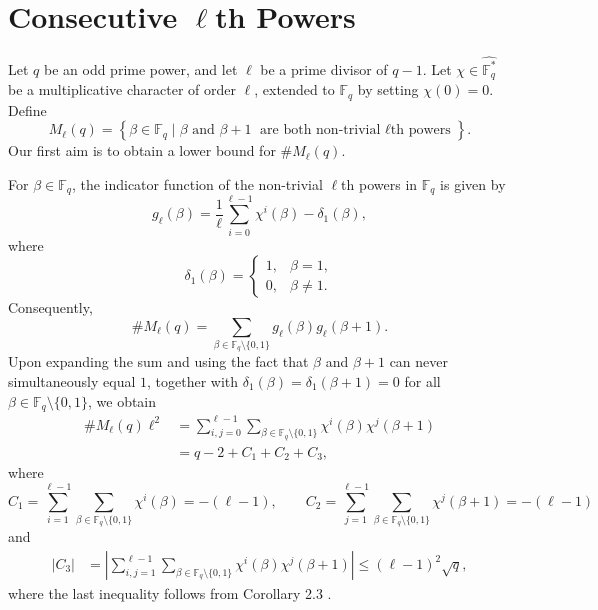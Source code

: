 \documentclass[12pt]{amsart}
\theoremstyle{definition}
\theoremstyle{remark}
\numberwithin{equation}{section}
\begin{document}
\section{Consecutive $\ell$th Powers}
Let $q$ be an odd prime power, and let $\ell$ be a prime divisor of $q-1$. Let $\chi\in\widehat{\mathbb{F}_q^*}$ be a multiplicative character of order $\ell$, extended to $\mathbb{F}_q$ by setting $\chi(0)=0$. Define
\[
M_{\ell}(q)=\left\{\beta\in\mathbb{F}_q \mid \beta\text{ and }\beta+1\text{ are both non-trivial $\ell$th powers}\right\}.
\]
Our first aim is to obtain a lower bound for $\#M_{\ell}(q)$. 

For $\beta\in\mathbb{F}_q$, the indicator function of the non-trivial $\ell$th powers in $\mathbb{F}_q$ is given by
\[
g_{\ell}(\beta)=\frac{1}{\ell}\sum_{i=0}^{\ell-1}\chi^i(\beta)-\delta_1(\beta),
\]
where
\[
\delta_1(\beta)=
\begin{cases}
1, & \beta=1,\\
0, & \beta\neq 1.
\end{cases}
\]
Consequently,
\[
\#M_{\ell}(q)
=
\sum_{\beta\in\mathbb{F}_q\setminus\{0,1\}}
g_{\ell}(\beta)g_{\ell}(\beta+1).
\]
Upon expanding the sum and using the fact that $\beta$ and $\beta+1$ can never simultaneously equal $1$, together with $\delta_1(\beta)=\delta_1(\beta+1)=0$ for all $\beta\in\mathbb{F}_q\setminus\{0,1\}$, we obtain
\begin{align*}
\#M_{\ell}(q)\ell^2
&=
\sum_{i,j=0}^{\ell-1}
\sum_{\beta\in\mathbb{F}_q\setminus\{0,1\}}
\chi^i(\beta)\chi^j(\beta+1)\\
&=q-2+C_{1}+C_{2}+C_{3},
\end{align*}
where 
\[
C_1=
\sum_{i=1}^{\ell-1}
\sum_{\beta\in\mathbb{F}_q\setminus\{0,1\}}
\chi^i(\beta)
=-(\ell-1),
\qquad
C_2=
\sum_{j=1}^{\ell-1}
\sum_{\beta\in\mathbb{F}_q\setminus\{0,1\}}
\chi^j(\beta+1)
=-(\ell-1)
\]
and
\[
\begin{aligned}
|C_3|
&=
\left|
\sum_{i,j=1}^{\ell-1}
\sum_{\beta\in\mathbb{F}_q\setminus\{0,1\}}
\chi^i(\beta)\chi^j(\beta+1)
\right|\leq (\ell-1)^2\sqrt{q},
\end{aligned}
\]
where the last inequality follows from Corollary 2.3 \cite{wang}.
\end{document}
